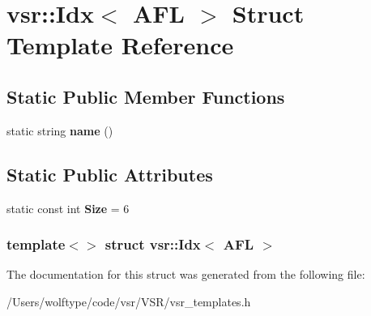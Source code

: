 \hypertarget{structvsr_1_1_idx_3_01_a_f_l_01_4}{\section{vsr\-:\-:Idx$<$ A\-F\-L $>$ Struct Template Reference}
\label{structvsr_1_1_idx_3_01_a_f_l_01_4}
}
\subsection*{Static Public Member Functions}
\begin{DoxyCompactItemize}
\item 
\hypertarget{structvsr_1_1_idx_3_01_a_f_l_01_4_aae51315d4e27bb4c6382f69eeae1f0de}{static string {\bfseries name} ()}\label{structvsr_1_1_idx_3_01_a_f_l_01_4_aae51315d4e27bb4c6382f69eeae1f0de}

\end{DoxyCompactItemize}
\subsection*{Static Public Attributes}
\begin{DoxyCompactItemize}
\item 
\hypertarget{structvsr_1_1_idx_3_01_a_f_l_01_4_afe98b88fa40807a8c058a4439717f175}{static const int {\bfseries Size} = 6}\label{structvsr_1_1_idx_3_01_a_f_l_01_4_afe98b88fa40807a8c058a4439717f175}

\end{DoxyCompactItemize}
\subsubsection*{template$<$$>$ struct vsr\-::\-Idx$<$ A\-F\-L $>$}



The documentation for this struct was generated from the following file\-:\begin{DoxyCompactItemize}
\item 
/\-Users/wolftype/code/vsr/\-V\-S\-R/vsr\-\_\-templates.\-h\end{DoxyCompactItemize}
